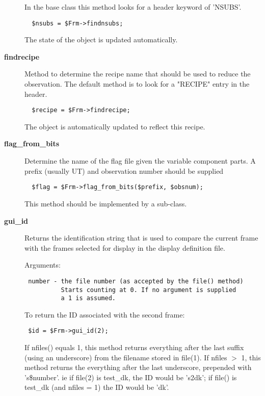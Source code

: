 \begin{description}
In the base class this method looks for a header keyword of 'NSUBS'.

\begin{verbatim}
  $nsubs = $Frm->findnsubs;
\end{verbatim}


The state of the object is updated automatically.

\item[\textbf{findrecipe}] \mbox{}

Method to determine the recipe name that should be used to reduce
the observation.
The default method is to look for a "RECIPE" entry in the header.

\begin{verbatim}
  $recipe = $Frm->findrecipe;
\end{verbatim}


The object is automatically updated to reflect this recipe.

\item[\textbf{flag\_from\_bits}] \mbox{}

Determine the name of the flag file given the variable
component parts. A prefix (usually UT) and observation number
should be supplied

\begin{verbatim}
  $flag = $Frm->flag_from_bits($prefix, $obsnum);
\end{verbatim}


This method should be implemented by a sub-class.

\item[\textbf{gui\_id}] \mbox{}

Returns the identification string that is used to compare the
current frame with the frames selected for display in the
display definition file.



Arguments:

\begin{verbatim}
 number - the file number (as accepted by the file() method)
          Starts counting at 0. If no argument is supplied
          a 1 is assumed.
\end{verbatim}


To return the ID associated with the second frame:

\begin{verbatim}
 $id = $Frm->gui_id(2);
\end{verbatim}


If nfiles() equals 1, this method returns everything after the last
suffix (using an underscore) from the filename stored in file(1). If
nfiles $>$ 1, this method returns the everything after the last 
underscore, prepended with 's\$number'. ie if file(2) is test\_dk,
the ID would be 's2dk'; if file() is test\_dk (and nfiles = 1) the
ID would be 'dk'.


\end{description}
